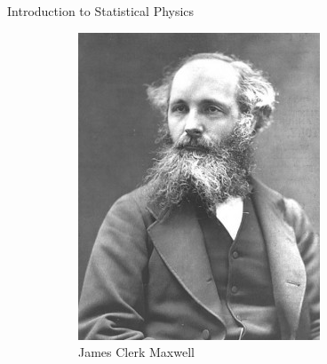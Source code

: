 \documentclass{beamer}
\begin{document}
\begin{frame}{Introduction to Statistical Physics}
\begin{figure}[h!]
\begin{subfigure}[b]{0.25\linewidth}
    \includegraphics[width=\linewidth]{figures/maxwell.jpeg}
    \caption{James Clerk Maxwell~\cite{maxwell}}
  \end{subfigure}%
\quad
  \begin{subfigure}[b]{0.25\linewidth}

\end{subfigure}
\end{figure}
\end{frame}
\end{document}
